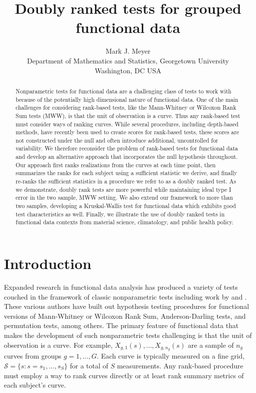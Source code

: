 \documentclass[12pt]{article}
\title{\vspace{-40pt}Doubly ranked tests for grouped functional data\vspace{-10pt}}
\author{Mark J. Meyer \\ Department of Mathematics and Statistics, Georgetown University \\ Washington, DC USA}
\date{}
\theoremstyle{plain}
\begin{document}
	\maketitle
	
\begin{abstract}
Nonparametric tests for functional data are a challenging class of tests to work with because of the potentially high dimensional nature of functional data. One of the main challenges for considering rank-based tests, like the Mann-Whitney or Wilcoxon Rank Sum tests (MWW), is that the unit of observation is a curve. Thus any rank-based test must consider ways of ranking curves. While several procedures, including depth-based methods, have recently been used to create scores for rank-based tests, these scores are not constructed under the null and often introduce additional, uncontrolled for variability. We therefore reconsider the problem of rank-based tests for functional data and develop an alternative approach that incorporates the null hypothesis throughout. Our approach first ranks realizations from the curves at each time point, then summarizes the ranks for each subject using a sufficient statistic we derive, and finally re-ranks the sufficient statistics in a procedure we refer to as a doubly ranked test. As we demonstrate, doubly rank tests are more powerful while maintaining ideal type I error in the two sample, MWW setting. We also extend our framework to more than two samples, developing a Kruskal-Wallis test for functional data which exhibits good test characteristics as well. Finally, we illustrate the use of doubly ranked tests in functional data contexts from material science, climatology, and public health policy.
\end{abstract}

	\section{Introduction}
	\label{s:intro}
	
	Expanded research in functional data analysis has produced a variety of tests couched in the framework of classic nonparametric tests including work by \cite{Hall2007, Lopez2009, Lopez2010, Chak2015, PomannStaicu2016, Lopez2017, Abramowicz2018, Berrett2021} and \cite{Melendez2021}. These various authors have built out hypothesis testing procedures for functional versions of Mann-Whitney or Wilcoxon Rank Sum, Anderson-Darling tests, and permutation tests, among others. The primary feature of functional data that makes the development of such nonparametric tests challenging is that the unit of observation is a curve. For example, $X_{g,1}(s), \ldots, X_{g,n_g}(s)$ are a sample of $n_g$ curves from groups $g = 1, \ldots, G$. Each curve is typically measured on a fine grid, $\mathcal{S} = \{s : s = s_1, \ldots, s_S\}$ for a total of $S$ measurements. Any rank-based procedure must employ a way to rank curves directly or at least rank summary metrics of each subject's curve.
	
\end{document}

